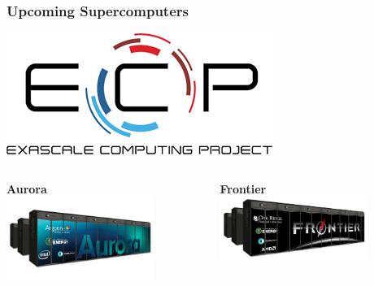 \begin{frame}
  \frametitle{Upcoming Supercomputers}
    \begin{center}
      \includegraphics[width=.25\textwidth]{./figures/ecp} \\
    \end{center}
  \begin{columns}[T]
    \begin{column}{0.49\textwidth}
      \begin{center}
        {\bf Aurora}\\
        \includegraphics[width=0.75\textwidth]{./figures/aurora}
      \end{center}
    \end{column}
    \begin{column}{0.49\textwidth}
      \begin{center}
        {\bf Frontier}\\
        \includegraphics[width=0.75\textwidth]{./figures/frontier}
      \end{center}
    \end{column}
  \end{columns}
  \begin{columns}[T]
    \begin{column}{0.49\textwidth}

\end{column}
\end{columns}
\end{frame}
